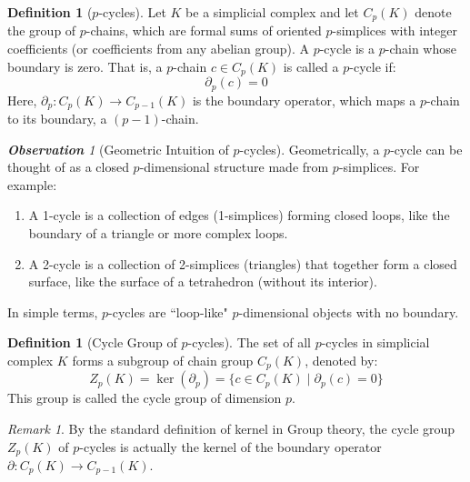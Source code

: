 \documentclass[12pt,oneside,reqno]{amsart}
\theoremstyle{plain}
\theoremstyle{definition}
\newtheorem{definition}[theorem]{Definition}
\theoremstyle{remark}
\newtheorem{remark}[theorem]{Remark}
\newtheorem{observation}[]{\textbf{Observation}}
\newcommand{\0}{{\textbf{0}}}
\begin{document}
\begin{definition}[$p$-cycles]\label{d:p cycles}
Let $K$ be a simplicial complex and let $C_p(K)$ denote the group of $p$-chains, which are formal sums of oriented $p$-simplices with integer coefficients (or coefficients from any abelian group). A $p$-cycle is a $p$-chain whose boundary is zero. That is, a $p$-chain $c \in C_p(K)$ is called a $p$-cycle if:
\[
\partial_p(c) = 0
\]
Here, $\partial_p \colon C_p(K) \to C_{p-1}(K)$ is the boundary operator, which maps a $p$-chain to its boundary, a $(p-1)$-chain.
\end{definition}

\begin{observation}[Geometric Intuition of $p$-cycles]
Geometrically, a $p$-cycle can be thought of as a closed $p$-dimensional structure made from $p$-simplices. For example:
\begin{enumerate}
\item A 1-cycle is a collection of edges (1-simplices) forming closed loops, like the boundary of a triangle or more complex loops.
\item A 2-cycle is a collection of 2-simplices (triangles) that together form a closed surface, like the surface of a tetrahedron (without its interior).
\end{enumerate}
In simple terms, $p$-cycles are ``loop-like" $p$-dimensional objects with no boundary.
\end{observation}

\begin{definition}[Cycle Group of $p$-cycles]\label{d:Cycle Group of p cycles}
The set of all $p$-cycles in simplicial complex $K$ forms a subgroup of chain group  $C_p(K)$, denoted by:
\[
Z_p(K) = \ker(\partial_p) = \{ c \in C_p(K) \mid \partial_p(c) = 0 \}
\]
This group is called the cycle group of dimension $p$.
\end{definition}

\begin{remark}
By the standard definition of kernel in Group theory, the cycle group $Z_p(K)$ of $p$-cycles is actually the kernel of the boundary operator $\partial \colon C_{p}(K) \to C_{p - 1}(K)$. 
\end{remark}
\end{document}

